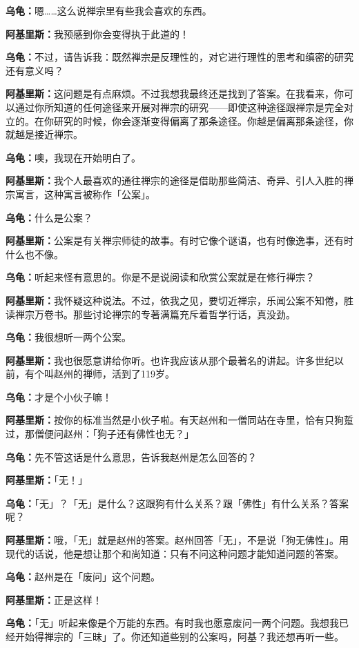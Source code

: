 \documentclass[
  12pt,
  twoside,
  openright,
  oldfontcommands,
]{memoir}
\newcommand{\dialogname}[1]{{\heifamily\bfseries #1}}
\begin{document}
\dialogname{乌龟：}嗯\ldots\ldots 这么说禅宗里有些我会喜欢的东西。

\dialogname{阿基里斯：}我预感到你会变得执于此道的！

\dialogname{乌龟：}不过，请告诉我：既然禅宗是反理性的，对它进行理性的思考和缜密的研究还有意义吗？

\dialogname{阿基里斯：}这问题是有点麻烦。不过我想我最终还是找到了答案。在我看来，你可以通过你所知道的任何途径来开展对禅宗的研究------即使这种途径跟禅宗是完全对立的。在你研究的时候，你会逐渐变得偏离了那条途径。你越是偏离那条途径，你就越是接近禅宗。

\dialogname{乌龟：}噢，我现在开始明白了。

\dialogname{阿基里斯：}我个人最喜欢的通往禅宗的途径是借助那些简洁、奇异、引人入胜的禅宗寓言，这种寓言被称作「公案」。

\dialogname{乌龟：}什么是公案？

\dialogname{阿基里斯：}公案是有关禅宗师徒的故事。有时它像个谜语，也有时像逸事，还有时什么也不像。

\dialogname{乌龟：}听起来怪有意思的。你是不是说阅读和欣赏公案就是在修行禅宗？

\dialogname{阿基里斯：}我怀疑这种说法。不过，依我之见，要切近禅宗，乐闻公案不知倦，胜读禅宗万卷书。那些讨论禅宗的专著满篇充斥着哲学行话，真没劲。

\dialogname{乌龟：}我很想听一两个公案。

\dialogname{阿基里斯：}我也很愿意讲给你听。也许我应该从那个最著名的讲起。许多世纪以前，有个叫赵州的禅师，活到了119岁。

\dialogname{乌龟：}才是个小伙子嘛！

\dialogname{阿基里斯：}按你的标准当然是小伙子啦。有天赵州和一僧同站在寺里，恰有只狗踅过，那僧便问赵州：「狗子还有佛性也无？」

\dialogname{乌龟：}先不管这话是什么意思，告诉我赵州是怎么回答的？

\dialogname{阿基里斯：}「无！」

\dialogname{乌龟：}「无」？「无」是什么？这跟狗有什么关系？跟「佛性」有什么关系？答案呢？

\dialogname{阿基里斯：}哦，「无」就是赵州的答案。赵州回答「无」，不是说「狗无佛性」。用现代的话说，他是想让那个和尚知道：只有不问这种问题才能知道问题的答案。

\dialogname{乌龟：}赵州是在「废问」这个问题。

\dialogname{阿基里斯：}正是这样！

\dialogname{乌龟：}「无」听起来像是个万能的东西。有时我也愿意废问一两个问题。我想我已经开始得禅宗的「三昧」了。你还知道些别的公案吗，阿基？我还想再听一些。
\end{document}
